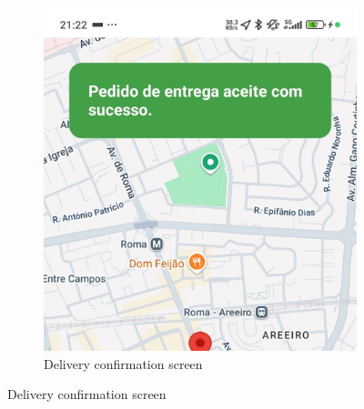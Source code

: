 \begin{figure}[H]
\begin{subfigure}[b]{0.48\textwidth}
        \includegraphics[width=\textwidth]{images/RequestAccepted.jpeg}
        \caption{Delivery confirmation screen}
        \label{fig:request_accepted}
    \end{subfigure}
    
    \vspace{0.5cm} %
    

\end{figure}
